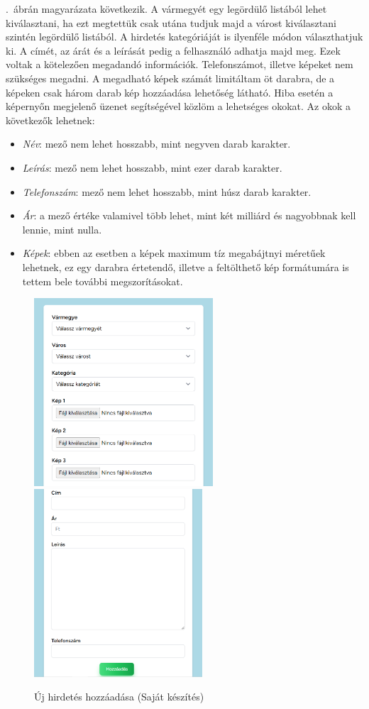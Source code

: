 \documentclass[]{thesis-ekf}
\theoremstyle{definition}
\theoremstyle{remark}
\begin{document}
		.~ábrán magyarázata következik. A vármegyét egy legördülő listából lehet kiválasztani, ha ezt megtettük csak utána tudjuk majd a várost kiválasztani szintén legördülő listából. A hirdetés kategóriáját is ilyenféle módon választhatjuk ki. A címét, az árát és a leírását pedig a felhasználó adhatja majd meg. Ezek voltak a kötelezően megadandó információk. Telefonszámot, illetve képeket nem szükséges megadni. A megadható képek számát limitáltam öt darabra, de a képeken csak három darab kép hozzáadása lehetőség látható. Hiba esetén a képernyőn megjelenő üzenet segítségével közlöm a lehetséges okokat. Az okok a következők lehetnek:
		\begin{itemize}
			\item \emph{Név}: mező nem lehet hosszabb, mint negyven darab karakter.
			\item \emph{Leírás}: mező nem lehet hosszabb, mint ezer darab karakter.
			\item \emph{Telefonszám}:  mező nem lehet hosszabb, mint húsz darab karakter.
			\item \emph{Ár}: a mező értéke valamivel több lehet, mint két milliárd és nagyobbnak kell lennie, mint nulla.
			\item \emph{Képek}: ebben az esetben a képek maximum tíz megabájtnyi méretűek lehetnek, ez egy darabra értetendő, illetve a feltölthető kép formátumára is tettem bele további megszorításokat.
		\end{itemize}
		\begin{figure}[ht!]
			\centering
			\includegraphics[height=7cm]{./felhasznaloi/hozzadas1}
			\includegraphics[height=7cm]{./felhasznaloi/hozzadas2}
			\caption{Új hirdetés hozzáadása (Saját készítés)} 
			\label{hirdetes-hozzadas-muvelet}
		\end{figure}
		
\end{document}
